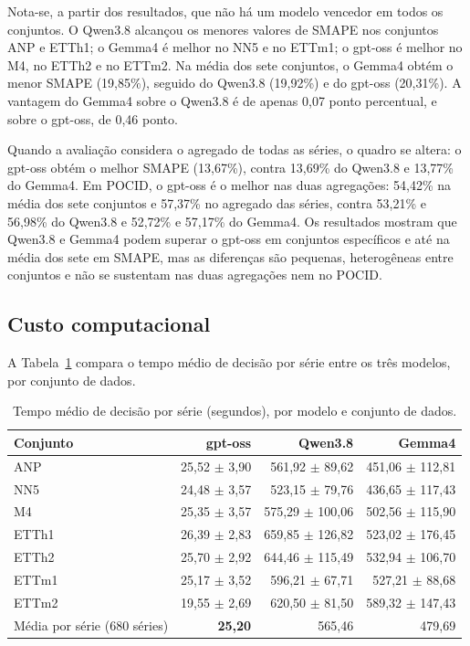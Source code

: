 Nota-se, a partir dos resultados, que não há um modelo vencedor em todos os conjuntos. O Qwen3.8 alcançou os menores valores de SMAPE nos conjuntos ANP e ETTh1; o Gemma4 é melhor no NN5 e no ETTm1; o gpt-oss é melhor no M4, no ETTh2 e no ETTm2. Na média dos sete conjuntos, o Gemma4 obtém o menor SMAPE (19,85\%), seguido do Qwen3.8 (19,92\%) e do gpt-oss (20,31\%). A vantagem do Gemma4 sobre o Qwen3.8 é de apenas 0,07 ponto percentual, e sobre o gpt-oss, de 0,46 ponto.

Quando a avaliação considera o agregado de todas as séries, o quadro se altera: o gpt-oss obtém o melhor SMAPE (13,67\%), contra 13,69\% do Qwen3.8 e 13,77\% do Gemma4. Em POCID, o gpt-oss é o melhor nas duas agregações: 54,42\% na média dos sete conjuntos e 57,37\% no agregado das séries, contra 53,21\% e 56,98\% do Qwen3.8 e 52,72\% e 57,17\% do Gemma4. Os resultados mostram que Qwen3.8 e Gemma4 podem superar o gpt-oss em conjuntos específicos e até na média dos sete em SMAPE, mas as diferenças são pequenas, heterogêneas entre conjuntos e não se sustentam nas duas agregações nem no POCID.

\subsection{Custo computacional}

A Tabela~\ref{tab:escolha-llm-custo} compara o tempo médio de decisão por série entre os três modelos, por conjunto de dados.

\begin{table}[H]
\small
\centering
\caption{Tempo médio de decisão por série (segundos), por modelo e conjunto de dados.}
\label{tab:escolha-llm-custo}
\begin{tabular}{@{}lrrr@{}}
\toprule
\textbf{Conjunto} & \textbf{gpt-oss} & \textbf{Qwen3.8} & \textbf{Gemma4} \\
\midrule
ANP    & 25,52 $\pm$ 3,90   & 561,92 $\pm$ 89,62   & 451,06 $\pm$ 112,81 \\
NN5    & 24,48 $\pm$ 3,57   & 523,15 $\pm$ 79,76   & 436,65 $\pm$ 117,43 \\
M4     & 25,35 $\pm$ 3,57   & 575,29 $\pm$ 100,06  & 502,56 $\pm$ 115,90 \\
ETTh1  & 26,39 $\pm$ 2,83   & 659,85 $\pm$ 126,82  & 523,02 $\pm$ 176,45 \\
ETTh2  & 25,70 $\pm$ 2,92   & 644,46 $\pm$ 115,49  & 532,94 $\pm$ 106,70 \\
ETTm1  & 25,17 $\pm$ 3,52   & 596,21 $\pm$ 67,71   & 527,21 $\pm$ 88,68 \\
ETTm2  & 19,55 $\pm$ 2,69   & 620,50 $\pm$ 81,50   & 589,32 $\pm$ 147,43 \\
\midrule
Média por série (680 séries) & \textbf{25,20} & 565,46 & 479,69 \\
\bottomrule
\end{tabular}
\end{table}

